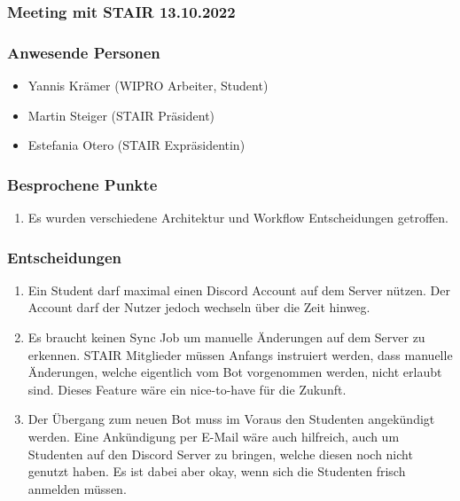 \documentclass[a4paper, table]{article}
\begin{document}
\newpage
\subsubsection{Meeting mit STAIR 13.10.2022}

\subsubsection*{Anwesende Personen}

\begin{itemize}
    \item Yannis Krämer (WIPRO Arbeiter, Student)
    \item Martin Steiger (STAIR Präsident)
    \item Estefania Otero (STAIR Expräsidentin)
\end{itemize}

\subsubsection*{Besprochene Punkte}

\begin{enumerate}
    \item Es wurden verschiedene Architektur und Workflow Entscheidungen getroffen.
\end{enumerate}

\subsubsection*{Entscheidungen}

\begin{enumerate}
    \item Ein Student darf maximal einen Discord Account auf dem Server nützen. Der Account darf der Nutzer jedoch wechseln über die Zeit hinweg.
    \item Es braucht keinen Sync Job um manuelle Änderungen auf dem Server zu erkennen. STAIR Mitglieder müssen Anfangs instruiert werden, dass manuelle Änderungen, welche eigentlich vom Bot vorgenommen werden, nicht erlaubt sind. Dieses Feature wäre ein nice-to-have für die Zukunft.
    \item Der Übergang zum neuen Bot muss im Voraus den Studenten angekündigt werden. Eine Ankündigung per E-Mail wäre auch hilfreich, auch um Studenten auf den Discord Server zu bringen, welche diesen noch nicht genutzt haben. Es ist dabei aber okay, wenn sich die Studenten frisch anmelden müssen.
\end{enumerate}
\end{document}
